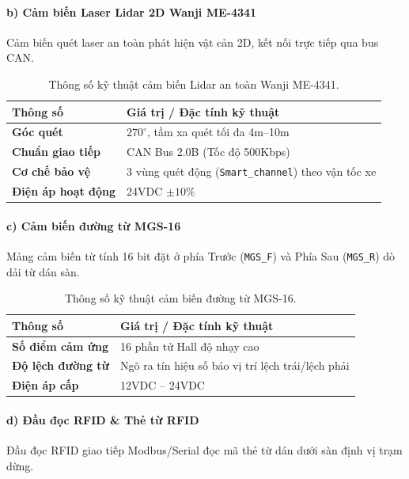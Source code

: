 \documentclass{article}
\begin{document}
\paragraph{b) Cảm biến Laser Lidar 2D Wanji ME-4341}
Cảm biến quét laser an toàn phát hiện vật cản 2D, kết nối trực tiếp qua bus CAN.

\begin{table}[!htbp]
\centering
\begin{tabularx}{\textwidth}{|>{\bfseries}l|X|}
\hline
\rowcolor{lightgray} Thông số & Giá trị / Đặc tính kỹ thuật \\ \hline
Góc quét & $270^\circ$, tầm xa quét tối đa 4m--10m \\ \hline
Chuẩn giao tiếp & CAN Bus 2.0B (Tốc độ 500Kbps) \\ \hline
Cơ chế bảo vệ & 3 vùng quét động (\texttt{Smart\_channel}) theo vận tốc xe \\ \hline
Điện áp hoạt động & 24VDC $\pm 10\%$ \\ \hline
\end{tabularx}
\caption{Thông số kỹ thuật cảm biến Lidar an toàn Wanji ME-4341.}
\label{tab:spec_lidar}
\end{table}

\paragraph{c) Cảm biến đường từ MGS-16}
Mảng cảm biến từ tính 16 bit đặt ở phía Trước (\texttt{MGS\_F}) và Phía Sau (\texttt{MGS\_R}) dò dải từ dán sàn.

\begin{table}[!htbp]
\centering
\begin{tabularx}{\textwidth}{|>{\bfseries}l|X|}
\hline
\rowcolor{lightgray} Thông số & Giá trị / Đặc tính kỹ thuật \\ \hline
Số điểm cảm ứng & 16 phần tử Hall độ nhạy cao \\ \hline
Độ lệch đường từ & Ngõ ra tín hiệu số báo vị trí lệch trái/lệch phải \\ \hline
Điện áp cấp & 12VDC -- 24VDC \\ \hline
\end{tabularx}
\caption{Thông số kỹ thuật cảm biến đường từ MGS-16.}
\label{tab:spec_mgs}
\end{table}

\paragraph{d) Đầu đọc RFID \& Thẻ từ RFID}
Đầu đọc RFID giao tiếp Modbus/Serial đọc mã thẻ từ dán dưới sàn định vị trạm dừng.
\end{document}
